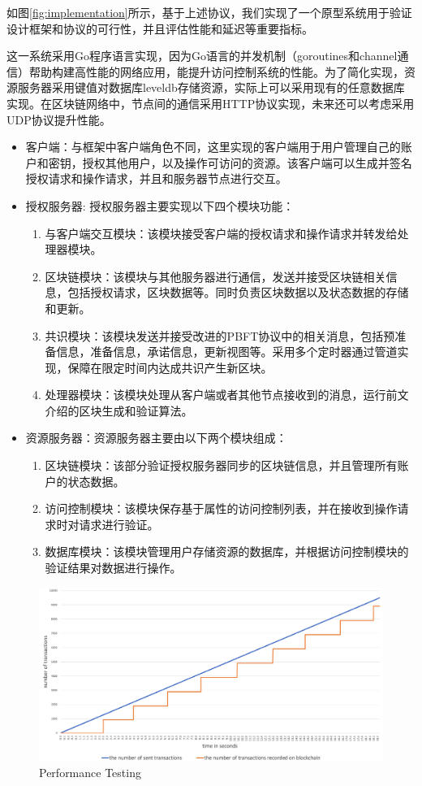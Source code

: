 如图\ref{fig:implementation}所示，基于上述协议，我们实现了一个原型系统用于验证设计框架和协议的可行性，并且评估性能和延迟等重要指标。

这一系统采用Go程序语言实现，因为Go语言的并发机制（goroutines和channel通信）帮助构建高性能的网络应用，能提升访问控制系统的性能。为了简化实现，资源服务器采用键值对数据库leveldb存储资源，实际上可以采用现有的任意数据库实现。在区块链网络中，节点间的通信采用HTTP协议实现，未来还可以考虑采用UDP协议提升性能。

\begin{itemize}
  \item 客户端：与框架中客户端角色不同，这里实现的客户端用于用户管理自己的账户和密钥，授权其他用户，以及操作可访问的资源。该客户端可以生成并签名授权请求和操作请求，并且和服务器节点进行交互。
  \item 授权服务器: 授权服务器主要实现以下四个模块功能：
    \begin{enumerate}
      \item 与客户端交互模块：该模块接受客户端的授权请求和操作请求并转发给处理器模块。
      \item 区块链模块：该模块与其他服务器进行通信，发送并接受区块链相关信息，包括授权请求，区块数据等。同时负责区块数据以及状态数据的存储和更新。
      \item 共识模块：该模块发送并接受改进的PBFT协议中的相关消息，包括预准备信息，准备信息，承诺信息，更新视图等。采用多个定时器通过管道实现，保障在限定时间内达成共识产生新区块。
      \item 处理器模块：该模块处理从客户端或者其他节点接收到的消息，运行前文介绍的区块生成和验证算法。
    \end{enumerate}
  \item 资源服务器：资源服务器主要由以下两个模块组成：
    \begin{enumerate}
      \item 区块链模块：该部分验证授权服务器同步的区块链信息，并且管理所有账户的状态数据。
      \item 访问控制模块：该模块保存基于属性的访问控制列表，并在接收到操作请求时对请求进行验证。
      \item 数据库模块：该模块管理用户存储资源的数据库，并根据访问控制模块的验证结果对数据进行操作。
    \end{enumerate}
\end{itemize}

\begin{figure}
\centering
\includegraphics[width=12cm, keepaspectratio]{figures/performance.png}
\caption{Performance Testing}
\label{fig:performance}
\end{figure}

